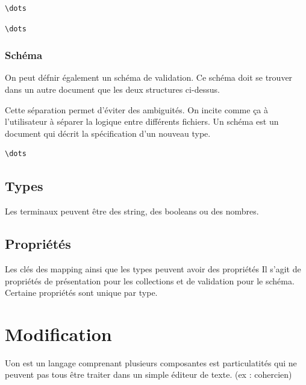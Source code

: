 \documentclass[
    iict, %
    il, %
]{heig-tb}
\begin{document}

\begin{lstlisting}[frame=single,caption={json-seq},label={json-seq}]
\dots
\end{lstlisting}


\begin{lstlisting}[frame=single,caption={yaml-seq},label={yaml-seq}]
\dots
\end{lstlisting}


\subsubsection{Schéma}
On peut défnir également un schéma de validation. Ce schéma doit se trouver dans un autre document que les deux structures ci-dessus.

Cette séparation permet d'éviter des ambiguités. On incite comme ça à l'utilisateur à séparer la logique entre différents fichiers.
Un schéma est un document qui décrit la spécification d'un nouveau type.

\begin{lstlisting}[frame=single,caption={yaml-seq},label={yaml-seq}]
    \dots
\end{lstlisting}


\subsection{Types}
Les terminaux peuvent être des string, des booleans ou des nombres.


\subsection{Propriétés}
Les clés des mapping ainsi que les types peuvent avoir des propriétés
Il s'agit de propriétés de présentation pour les collections et de validation pour le schéma.
Certaine propriétés sont unique par type.


\section{Modification}


Uon est un langage comprenant plusieurs composantes est particulatités qui ne peuvent pas tous être traiter dans un simple éditeur de texte. (ex : cohercien)
%
\end{document}

